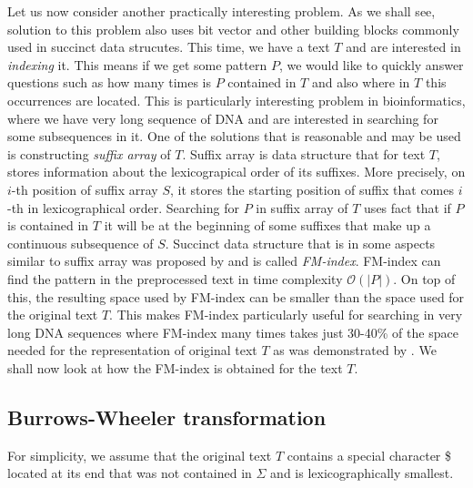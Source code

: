 Let us now consider another practically interesting problem. As we shall see, solution
to this problem also uses bit vector and other building blocks commonly used in succinct
data strucutes. This time, we have a text $T$ and are interested in \textit{indexing} it.
This means if we get some pattern $P$, we would like to quickly answer questions such as
how many times is $P$ contained in $T$ and also where in $T$ this occurrences are located.
This is particularly interesting problem in bioinformatics, where we have very long sequence
of DNA and are interested in searching for some subsequences in it. One of the solutions that
is reasonable and may be used is constructing \textit{suffix array} of $T$. Suffix array is
data structure that for text $T$, stores information about the lexicograpical order of its
suffixes. More precisely, on $i$-th position of suffix array $S$, it stores the starting
position of suffix that comes $i$-th in lexicographical order. Searching for $P$ in suffix
array of $T$ uses fact that if $P$ is contained in $T$ it will be at the beginning of some
suffixes that make up a continuous subsequence of $S$. Succinct data structure that is in
some aspects similar to suffix array was proposed by \cite{ferragina2000opportunistic} and
is called \textit{FM-index}. FM-index can find the pattern in the preprocessed text in time
complexity $\mathcal{O}(|P|)$. On top of this, the resulting space used by FM-index can be
smaller than the space used for the original text $T$. This makes FM-index particularly useful
for searching in very long DNA sequences where FM-index many times takes just 30-40\% of the
space needed for the representation of original text $T$ as was demonstrated by
\cite{ferragina2001experimental}. We shall now look at how the FM-index is obtained for the text
$T$.

\subsection{Burrows-Wheeler transformation}

For simplicity, we assume that the original text $T$ contains a special character \$
located at its end that was not contained in $\Sigma$ and is lexicographically smallest.

